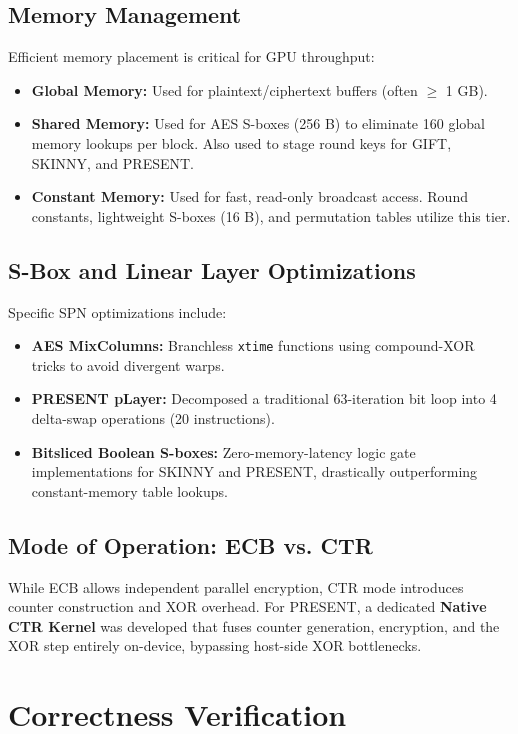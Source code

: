 \documentclass{article}
\begin{document}
\subsection{Memory Management}
Efficient memory placement is critical for GPU throughput:
\begin{itemize}
    \item \textbf{Global Memory:} Used for plaintext/ciphertext buffers (often $\geq$ 1 GB).
    \item \textbf{Shared Memory:} Used for AES S-boxes (256 B) to eliminate 160 global memory lookups per block. Also used to stage round keys for GIFT, SKINNY, and PRESENT.
    \item \textbf{Constant Memory:} Used for fast, read-only broadcast access. Round constants, lightweight S-boxes (16 B), and permutation tables utilize this tier.
\end{itemize}

\subsection{S-Box and Linear Layer Optimizations}
Specific SPN optimizations include:
\begin{itemize}
    \item \textbf{AES MixColumns:} Branchless \texttt{xtime} functions using compound-XOR tricks to avoid divergent warps.
    \item \textbf{PRESENT pLayer:} Decomposed a traditional 63-iteration bit loop into 4 delta-swap operations (20 instructions).
    \item \textbf{Bitsliced Boolean S-boxes:} Zero-memory-latency logic gate implementations for SKINNY and PRESENT, drastically outperforming constant-memory table lookups.
\end{itemize}

\subsection{Mode of Operation: ECB vs. CTR}
While ECB allows independent parallel encryption, CTR mode introduces counter construction and XOR overhead. For PRESENT, a dedicated \textbf{Native CTR Kernel} was developed that fuses counter generation, encryption, and the XOR step entirely on-device, bypassing host-side XOR bottlenecks.

\section{Correctness Verification}
\end{document}

